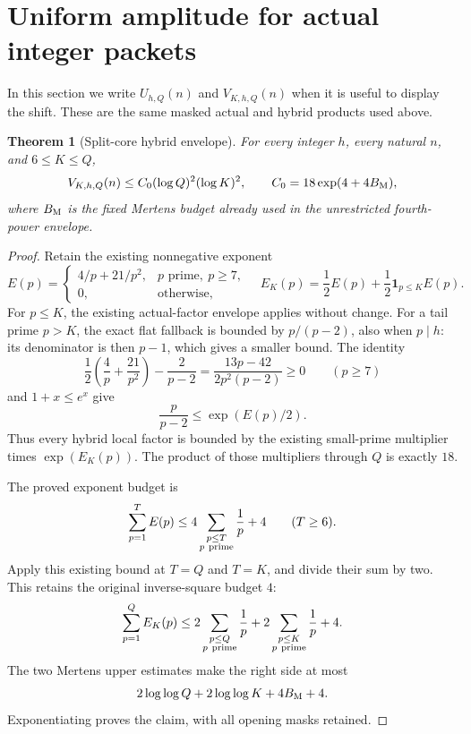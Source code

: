\documentclass[11pt]{article}
\newtheorem{theorem}{Theorem}[section]
\begin{document}
\section{Uniform amplitude for actual integer packets}
In this section we write \(U_{h,Q}(n)\) and \(V_{K,h,Q}(n)\) when it
is useful to display the shift. These are the same masked actual and
hybrid products used above.

\begin{theorem}[Split-core hybrid envelope]\label{thm:split-core-envelope}
For every integer \(h\), every natural \(n\), and \(6\leq K\leq Q\),
\[
 V_{K,h,Q}(n)\leq
 C_0(\log Q)^2(\log K)^2,\qquad
 C_0=18\exp(4+4B_{\rm M}),
\]
where \(B_{\rm M}\) is the fixed Mertens budget already used in the
unrestricted fourth-power envelope.
\end{theorem}
\begin{proof}
Retain the existing nonnegative exponent
\[
 E(p)=
 \begin{cases}
 4/p+21/p^2,&p\text{ prime},\ p\geq7,\\
 0,&\text{otherwise},
 \end{cases}
\quad
 E_K(p)=\frac12E(p)+\frac12\mathbf1_{p\leq K}E(p).
\]
For \(p\leq K\), the existing actual-factor envelope applies without
change. For a tail prime \(p>K\), the exact flat fallback is bounded by
\(p/(p-2)\), also when \(p\mid h\): its denominator is then \(p-1\),
which gives a smaller bound. The identity
\[
 \frac12\left(\frac4p+\frac{21}{p^2}\right)-\frac2{p-2}
       =\frac{13p-42}{2p^2(p-2)}\geq0\qquad(p\geq7)
\]
and \(1+x\leq e^x\) give
\[
                  \frac p{p-2}\leq \exp(E(p)/2).
\]
Thus every hybrid local factor is bounded by the existing small-prime
multiplier times \(\exp(E_K(p))\). The product of those multipliers
through \(Q\) is exactly \(18\).

The proved exponent budget is
\[
 \sum_{p=1}^{T}E(p)\leq
       4\sum_{\substack{p\leq T\\p\ {\rm prime}}}\frac1p+4
       \qquad(T\geq6).
\]
Apply this existing bound at \(T=Q\) and \(T=K\), and divide their sum
by two. This retains the original inverse-square budget \(4\):
\[
 \sum_{p=1}^{Q}E_K(p)\leq
       2\sum_{\substack{p\leq Q\\p\ {\rm prime}}}\frac1p+
       2\sum_{\substack{p\leq K\\p\ {\rm prime}}}\frac1p+4.
\]
The two Mertens upper estimates make the right side at most
\[
        2\log\log Q+2\log\log K+4B_{\rm M}+4.
\]
Exponentiating proves the claim, with all opening masks retained.
\end{proof}
\end{document}
